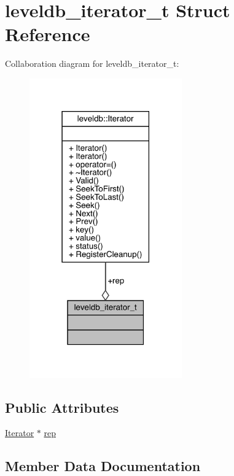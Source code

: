 \hypertarget{structleveldb__iterator__t}{}\section{leveldb\+\_\+iterator\+\_\+t Struct Reference}
\label{structleveldb__iterator__t}


Collaboration diagram for leveldb\+\_\+iterator\+\_\+t\+:
\nopagebreak
\begin{figure}[H]
\begin{center}
\leavevmode
\includegraphics[width=186pt]{structleveldb__iterator__t__coll__graph}
\end{center}
\end{figure}
\subsection*{Public Attributes}
\begin{DoxyCompactItemize}
\item 
\mbox{\hyperlink{classleveldb_1_1_iterator}{Iterator}} $\ast$ \mbox{\hyperlink{structleveldb__iterator__t_a051a1df01c49d34f34628ae1467f9377}{rep}}
\end{DoxyCompactItemize}


\subsection{Member Data Documentation}
\mbox{\label{structleveldb__iterator__t_a051a1df01c49d34f34628ae1467f9377}} 
